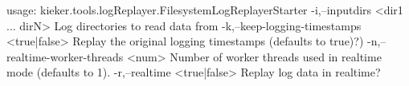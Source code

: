usage: kieker.tools.logReplayer.FilesystemLogReplayerStarter
 -i,--inputdirs <dir1 ... dirN>              Log directories to read data
                                             from
 -k,--keep-logging-timestamps <true|false>   Replay the original logging
                                             timestamps (defaults to
                                             true)?)
 -n,--realtime-worker-threads <num>          Number of worker threads used
                                             in realtime mode (defaults to
                                             1).
 -r,--realtime <true|false>                  Replay log data in realtime?
